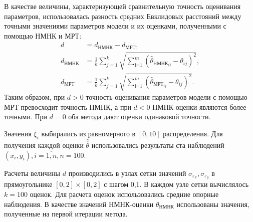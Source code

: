 В качестве величины, характеризующей сравнительную точность оценивания параметров,
использовалась разность средних Евклидовых расстояний
между точными значениями параметров модели и их оценками, полученными
с помощью НМНК и МРТ:
\begin{equation}
  \begin{aligned}
    d &= d_{\text{НМНК}} - d_{\text{МРТ}}, \\
    d_{\text{НМНК}} &=
    \frac{1}{k} \sum_{j=1}^k
    \sqrt{\sum_{\text{i=1}}^m (\hat{\theta}_{\text{НМНК}_{ij}} - \theta_{ij})^2}, \\
    d_{\text{МРТ}} &=
    \frac{1}{k} \sum_{j=1}^k
    \sqrt{\sum_{\text{i=1}}^m (\hat{\theta}_{\text{МРТ}_{ij}} - \theta_{ij})^2}.
  \end{aligned}
  \label{eq:dst_nonlinear_param}
\end{equation}
Таким образом, при \( d > 0 \) точность оценивания параметров модели с помощью МРТ
превосходит точность НМНК, а при \( d < 0 \) НМНК-оценки являются более точными.
При \( d = 0 \) оба метода дают оценки одинаковой точности.

Значения \( \xi_i \) выбирались из равномерного в \( [0, 10] \) распределения.
Для получения каждой оценки \( \hat{\overline{\theta}} \) использовались результаты
ста наблюдений \( ( x_i, y_i ), i = \overline{1, n}, n = 100 \).

Расчеты величины \( d \) производились в узлах сетки значений
\( \sigma_{\varepsilon_x}, \sigma_{\varepsilon_y} \) в прямоугольнике
\( [0, 2] \times [0, 2] \) с шагом 0{,}1.
В каждом узле сетки вычислялось \( k = 100 \) оценок.
Для расчета оценок использовались средние опорные наблюдения.
В качестве значений НМНК-оценки \( \theta_{\text{НМНК}} \)
использованы значения, полученные на первой итерации метода.




